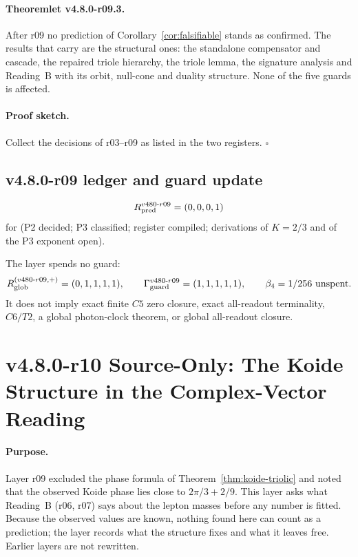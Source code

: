 \paragraph{Theoremlet v4.8.0-r09.3.}
After r09 no prediction of Corollary~\ref{cor:falsifiable} stands as confirmed.  The results that carry
are the structural ones: the standalone compensator and cascade, the repaired triole hierarchy, the
triole lemma, the signature analysis and Reading~B with its orbit, null-cone and duality structure.
None of the five guards is affected.

\paragraph{Proof sketch.}
Collect the decisions of r03--r09 as listed in the two registers.  \(\square\)

\subsection*{v4.8.0-r09 ledger and guard update}
\label{subsec:v480-r09-ledger-guard}

\[
R_{\rm pred}^{v480\text{-}r09}=(0,0,0,1)
\]
for (P2 decided; P3 classified; register compiled; derivations of \(K=2/3\) and of the P3 exponent open).

The layer spends no guard:
\[
R_{\rm glob}^{(v480\text{-}r09,+)}=(0,1,1,1,1),
\qquad
\Gamma_{\rm guard}^{v480\text{-}r09}=(1,1,1,1,1),
\qquad
\beta_4=1/256\ \text{unspent}.
\]
It does not imply exact finite \(C5\) zero closure, exact all-readout terminality,
\(C6/T2\), a global photon-clock theorem, or global all-readout closure.


\clearpage
\section*{v4.8.0-r10 Source-Only: The Koide Structure in the Complex-Vector Reading}
\label{sec:v480-r10-koide-reading-b}

\paragraph{Purpose.}
Layer r09 excluded the phase formula of Theorem~\ref{thm:koide-triolic} and noted that the observed
Koide phase lies close to \(2\pi/3+2/9\).  This layer asks what Reading~B (r06, r07) says about the
lepton masses before any number is fitted.  Because the observed values are known, nothing found here
can count as a prediction; the layer records what the structure fixes and what it leaves free.
Earlier layers are not rewritten.

